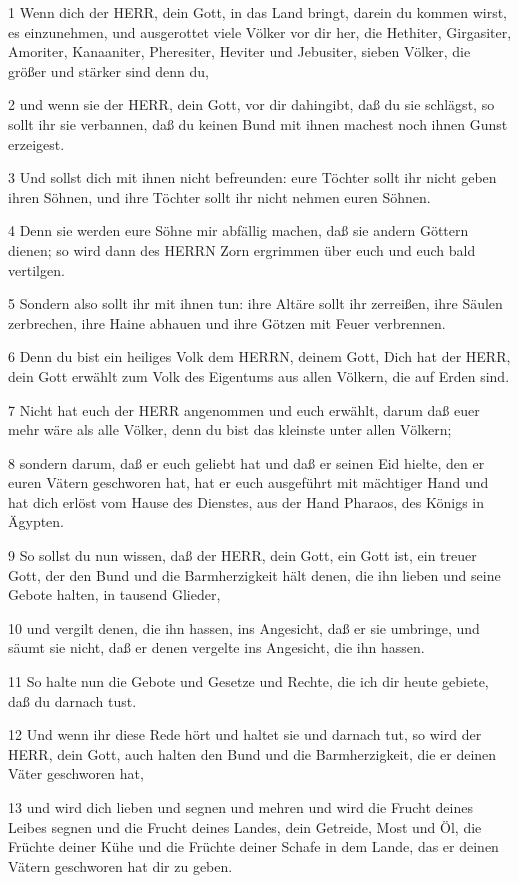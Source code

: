\par 1 Wenn dich der HERR, dein Gott, in das Land bringt, darein du kommen wirst, es einzunehmen, und ausgerottet viele Völker vor dir her, die Hethiter, Girgasiter, Amoriter, Kanaaniter, Pheresiter, Heviter und Jebusiter, sieben Völker, die größer und stärker sind denn du,
\par 2 und wenn sie der HERR, dein Gott, vor dir dahingibt, daß du sie schlägst, so sollt ihr sie verbannen, daß du keinen Bund mit ihnen machest noch ihnen Gunst erzeigest.
\par 3 Und sollst dich mit ihnen nicht befreunden: eure Töchter sollt ihr nicht geben ihren Söhnen, und ihre Töchter sollt ihr nicht nehmen euren Söhnen.
\par 4 Denn sie werden eure Söhne mir abfällig machen, daß sie andern Göttern dienen; so wird dann des HERRN Zorn ergrimmen über euch und euch bald vertilgen.
\par 5 Sondern also sollt ihr mit ihnen tun: ihre Altäre sollt ihr zerreißen, ihre Säulen zerbrechen, ihre Haine abhauen und ihre Götzen mit Feuer verbrennen.
\par 6 Denn du bist ein heiliges Volk dem HERRN, deinem Gott, Dich hat der HERR, dein Gott erwählt zum Volk des Eigentums aus allen Völkern, die auf Erden sind.
\par 7 Nicht hat euch der HERR angenommen und euch erwählt, darum daß euer mehr wäre als alle Völker, denn du bist das kleinste unter allen Völkern;
\par 8 sondern darum, daß er euch geliebt hat und daß er seinen Eid hielte, den er euren Vätern geschworen hat, hat er euch ausgeführt mit mächtiger Hand und hat dich erlöst vom Hause des Dienstes, aus der Hand Pharaos, des Königs in Ägypten.
\par 9 So sollst du nun wissen, daß der HERR, dein Gott, ein Gott ist, ein treuer Gott, der den Bund und die Barmherzigkeit hält denen, die ihn lieben und seine Gebote halten, in tausend Glieder,
\par 10 und vergilt denen, die ihn hassen, ins Angesicht, daß er sie umbringe, und säumt sie nicht, daß er denen vergelte ins Angesicht, die ihn hassen.
\par 11 So halte nun die Gebote und Gesetze und Rechte, die ich dir heute gebiete, daß du darnach tust.
\par 12 Und wenn ihr diese Rede hört und haltet sie und darnach tut, so wird der HERR, dein Gott, auch halten den Bund und die Barmherzigkeit, die er deinen Väter geschworen hat,
\par 13 und wird dich lieben und segnen und mehren und wird die Frucht deines Leibes segnen und die Frucht deines Landes, dein Getreide, Most und Öl, die Früchte deiner Kühe und die Früchte deiner Schafe in dem Lande, das er deinen Vätern geschworen hat dir zu geben.
